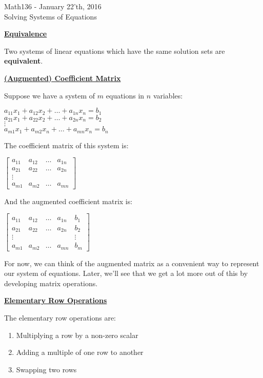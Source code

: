 \documentclass{letter}
\newcommand{\0}[1]{\begin{bmatrix}#1\end{bmatrix}}
\newcommand{\h}[1]{\underline{\textbf{#1}}}
\begin{document}
	\begin{center}
		\LARGE Math136 - January 22'th, 2016\\
		\large Solving Systems of Equations
	\end{center}
	\vspace{0.25 in}
	
	\h{Equivalence}

	Two systems of linear equations which have the same solution sets are \textbf{equivalent}.
	
	\h{(Augmented) Coefficient Matrix}
	
	Suppose we have a system of $m$ equations in $n$ variables:
	
	$a_{11}x_1 + a_{12}x_2 + \dots + a_{1n}x_n = b_1$\\
	$a_{21}x_1 + a_{22}x_2 + \dots + a_{2n}x_n = b_2$\\
	$\vdots$\\
	$a_{m1}x_1 + a_{m2}x_n + \dots + a_{mn}x_n = b_n$
	
	The coefficient matrix of this system is:
	
	$\0{a_{11}&a_{12}&\dots&a_{1n}\\a_{21}&a_{22}&\dots&a_{2n}\\\vdots\\a_{m1}&a_{m2}&\dots&a_{mn}}$
	
	And the augmented coefficient matrix is:
	
	$\left[\begin{array}{cccc|c}
		a_{11}&a_{12}&\dots&a_{1n}&b_1\\a_{21}&a_{22}&\dots&a_{2n}&b_2\\\vdots&&&&\vdots\\a_{m1}&a_{m2}&\dots&a_{mn}&b_m
	\end{array}\right]$
	
	For now, we can think of the augmented matrix as a convenient way to represent our system of equations. Later, we'll see that we get a lot more out of this by developing matrix operations.
	
	\h{Elementary Row Operations}
	
	The elementary row operations are:
	
	\begin{enumerate}
		\item Multiplying a row by a non-zero scalar
		\item Adding a multiple of one row to another
		\item Swapping two rows
	\end{enumerate}
	
\end{document}
